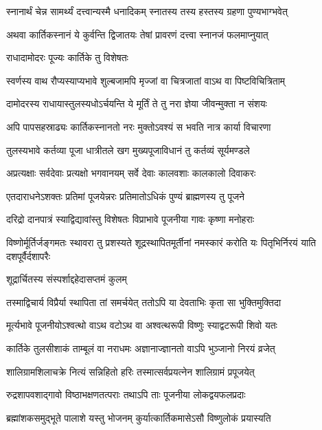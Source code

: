 \twolineshloka
{स्नानार्थं चेन्न सामर्थ्यं दत्त्वान्यस्मै धनादिकम्}
{स्नातस्य तस्य हस्तस्य ग्रहणा पुण्यभाग्भवेत्} %

\twolineshloka
{अथवा कार्तिकस्नानं ये कुर्वन्ति द्विजातयः}
{तेषां प्रावरणं दत्त्वा स्नानजं फलमाप्नुयात्} %


\onelineshloka
{राधादामोदरः पूज्यः कार्तिके तु विशेषतः} %

\twolineshloka
{स्वर्णस्य वाथ रौप्यस्याप्यभावे शुल्बजामपि}
{मृज्जां वा चित्रजातां वाऽथ वा पिष्टविचित्रिताम्} %

\twolineshloka
{दामोदरस्य राधायास्तुलस्यधोऽर्चयन्ति ये}
{मूर्तिं ते तु नरा ज्ञेया जीवन्मुक्ता न संशयः} %

\twolineshloka
{अपि पापसहस्राढ्यः कार्तिकस्नानतो नरः}
{मुक्तोऽवश्यं स भवति नात्र कार्या विचारणा} %

\twolineshloka
{तुलस्यभावे कर्तव्या पूजा धात्रीतले खग}
{मुख्यपूजाविधानं तु कर्तव्यं सूर्यमण्डले} %

\twolineshloka
{अप्रत्यक्षाः सर्वदेवाः प्रत्यक्षो भगवानयम्}
{सर्वे देवाः कालवशाः कालकालो दिवाकरः} %

\twolineshloka
{एतदाराधनेऽशक्तः प्रतिमां पूजयेन्नरः}
{प्रतिमातोऽधिकं पुण्यं ब्राह्मणस्य तु पूजने} %

\twolineshloka
{दरिद्रो दानपात्रं स्याद्विद्यावांस्तु विशेषतः}
{विप्राभावे पूजनीया गावः कृष्णा मनोहराः} %

\threelineshloka
{विष्णोर्मूर्तिर्जङ्गमतः स्थावरा तु प्रशस्यते}
{शूद्रस्थापितमूर्तीनां नमस्कारं करोति यः}
{पितृभिर्निरयं याति दशपूर्वैर्दशापरैः} %


\onelineshloka
{शूद्रार्चितस्य संस्पर्शाद्दहेदासप्तमं कुलम्} %

\twolineshloka
{तस्माद्विचार्य विप्रैर्या स्थापिता तां समर्चयेत्}
{ततोऽपि या देवताभिः कृता सा भुक्तिमुक्तिदा} %

\twolineshloka
{मूर्त्यभावे पूजनीयोऽश्वत्थो वाऽथ वटोऽथ वा}
{अश्वत्थरूपी विष्णुः स्याद्वटरूपी शिवो यतः} %

\twolineshloka
{कार्तिके तुलसीशाकं ताम्बूलं वा नराधमः}
{अज्ञानाज्ज्ञानतो वाऽपि भुञ्जानो निरयं व्रजेत्} %

\twolineshloka
{शालिग्रामशिलाचक्रे नित्यं सन्निहितो हरिः}
{तस्मात्सर्वप्रयत्नेन शालिग्रामं प्रपूजयेत्} %

\twolineshloka
{रुद्रशापवशाद्गावो विष्ठाभक्षणतत्पराः}
{तथाऽपि ताः पूजनीया लोकद्वयफलप्रदाः} %

\twolineshloka
{ब्रह्मांशकसमुद्भूते पालाशे यस्तु भोजनम्}
{कुर्यात्कार्तिकमासेऽसौ विष्णुलोकं प्रयास्यति} %


